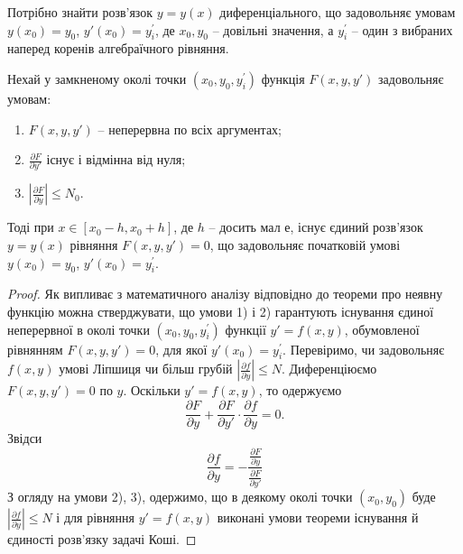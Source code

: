 Потрібно знайти розв’язок $y=y(x)$ диференціального, що задовольняє умовам $y(x_0)=y_0$, $y'(x_0)=y_i^\prime$, де $x_0,y_0$ -- довільні значення, а $y_i^\prime$ -- один з вибраних наперед коренів алгебраїчного рівняння.

\begin{theorem}
	Нехай у замкненому околі точки $(x_0, y_0, y_i^\prime)$ функція $F(x,y,y')$ задовольняє умовам:
	\begin{enumerate}
		\item $F(x,y,y')$ -- неперервна по всіх аргументах;
		\item $\frac{\partial F}{\partial y'}$ існує і відмінна від нуля;
		\item $\left| \frac{\partial F}{\partial y}\right| \le N_0$.
	\end{enumerate}
	Тоді при $x \in [x_0 - h, x_0 + h]$, де $h$ -- досить мал е, існує єдиний розв’язок $y=y(x)$ рівняння $F(x, y, y') =0$, що задовольняє початковій умові $y(x_0)=y_0$, $y'(x_0)=y_i^\prime$.
\end{theorem}
\begin{proof}
	Як випливає з математичного аналізу відповідно до теореми про неявну функцію можна стверджувати, що умови 1) і 2) гарантують існування єдиної неперервної в околі точки $(x_0,y_0,y_i^\prime)$ функції $y'=f(x,y)$, обумовленої рівнянням $F(x,y,y')=0$, для якої $y'(x_0)=y_i^\prime$. Перевіримо, чи задовольняє $f(x,y)$ умові Ліпшиця чи більш грубій $\left|\frac{\partial f}{\partial y}\right| \le N$. Диференціюємо $F(x,y,y')=0$ по $y$. Оскільки $y'=f(x,y)$, то одержуємо
	\begin{equation*}
		\frac{\partial F}{\partial y} + \frac{\partial F}{\partial y'} \cdot \frac{\partial f}{\partial y} = 0.
	\end{equation*}
	Звідси
	\begin{equation*}
		\frac{\partial f}{\partial y} = - \frac{\frac{\partial F}{\partial y}}{\frac{\partial F}{\partial y'}} 
	\end{equation*} 
	З огляду на умови 2), 3), одержимо, що в деякому околі точки $(x_0,y_0)$ буде $\left|\frac{\partial f}{\partial y}\right| \le N$ і для рівняння $y'=f(x,y)$ виконані умови теореми існування й єдиності розв’язку задачі Коші.
\end{proof}

